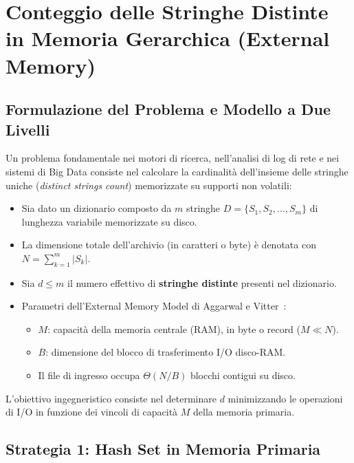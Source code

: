 \FloatBarrier
\section{Conteggio delle Stringhe Distinte in Memoria Gerarchica (External Memory)}
\label{sec:conteggio-stringhe-memoria-esterna}

\FloatBarrier
\subsection{Formulazione del Problema e Modello a Due Livelli}
\label{subsec:modello-conteggio-stringhe-esterne}

Un problema fondamentale nei motori di ricerca, nell'analisi di log di rete e nei sistemi di Big Data consiste nel calcolare la cardinalit\`a dell'insieme delle stringhe uniche (\textit{distinct strings count}) memorizzate su supporti non volatili:
\begin{itemize}
  \item Sia dato un dizionario composto da $m$ stringhe $D = \{S_1, S_2, \dots, S_m\}$ di lunghezza variabile memorizzate su disco.
  \item La dimensione totale dell'archivio (in caratteri o byte) \`e denotata con $N = \sum_{k=1}^m |S_k|$.
  \item Sia $d \le m$ il numero effettivo di \textbf{stringhe distinte} presenti nel dizionario.
  \item Parametri dell'External Memory Model di Aggarwal e Vitter~\cite{aggarwal1988}:
  \begin{itemize}
    \item $M$: capacit\`a della memoria centrale (RAM), in byte o record ($M \ll N$).
    \item $B$: dimensione del blocco di trasferimento I/O disco-RAM.
    \item Il file di ingresso occupa $\Theta(N/B)$ blocchi contigui su disco.
  \end{itemize}
\end{itemize}

L'obiettivo ingegneristico consiste nel determinare $d$ minimizzando le operazioni di I/O in funzione dei vincoli di capacit\`a $M$ della memoria primaria.

\FloatBarrier
\subsection{Strategia 1: Hash Set in Memoria Primaria}
\label{subsec:soluzione-1-hash-set-ram}

